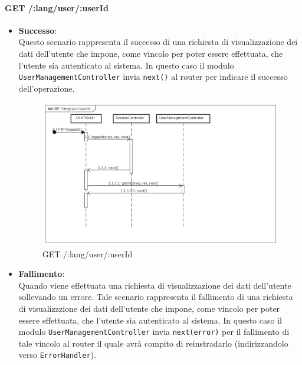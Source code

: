 \paragraph{GET /:lang/user/:userId}
\begin{itemize}
\item \textbf{Successo}:\\
Questo scenario rappresenta il successo di una richiesta di visualizzazione dei dati dell'utente che impone, come vincolo per poter essere effettuata, che l'utente sia autenticato al sistema.  
In questo caso il modulo \texttt{UserManagementController} invia \texttt{next()} al router per indicare il successo dell'operazione.

\label{Procedura di visualizzazione dati utente}
\begin{figure}[ht]
	\centering
	\includegraphics[scale=0.40]{UML/DiagrammiDiSequenza/Back-end/GET_LangUserUserIdSuccess.png}
	\caption{GET /:lang/user/:userId}
\end{figure}

\FloatBarrier

\item \textbf{Fallimento}:
\\
Quando viene effettuata una richiesta di visualizzazione dei dati dell'utente sollevando un errore. Tale scenario rappresenta il fallimento di una richiesta di visualizzzione dei dati dell'utente che impone, come vincolo per poter essere effettuata, che l'utente sia autenticato al sistema. In questo caso il modulo \texttt{UserManagementController} invia \texttt{next(error)} per il fallimento di tale vincolo al router il quale avrà compito di reinstradarlo (indirizzandolo verso \texttt{ErrorHandler}).


\end{itemize}
